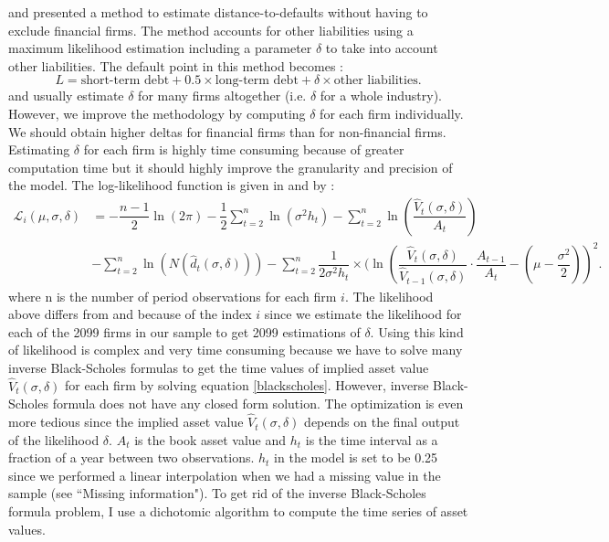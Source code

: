 \citet{Duan2012} and \citet{Duan2012DTD} presented a method to estimate distance-to-defaults without having to exclude financial firms. The method accounts for other liabilities using a maximum likelihood estimation including a parameter $\delta$ to take into account other liabilities. 
The default point in this method becomes :
\begin{equation}
L = \text{short-term debt} + 0.5 \times \text{long-term debt} + \delta \times \text{other liabilities}.
\end{equation}
\citet{Duan2012} and \citet{Duan2012DTD} usually estimate $\delta$ for many firms altogether (i.e. $\delta$ for a whole industry). However, we improve the methodology by computing $\delta$ for each firm individually. We should obtain higher deltas for financial firms than for non-financial firms. Estimating $\delta$ for each firm is highly time consuming because of greater computation time but it should highly improve the granularity and precision of the model.
The log-likelihood function is given in \citet{Duan2012} and \citet{Duan2012DTD} by :
\begin{align*}
\mathcal{L}_i(\mu,\sigma,\delta) &= -\dfrac{n-1}{2}\ln(2\pi) - \dfrac{1}{2}\sum_{t=2}^n \ln(\sigma^2h_t) - \sum_{t=2}^n \ln(\dfrac{\hat{V}_t(\sigma,\delta)}{A_t}) \\
&-\sum_{t=2}^n \ln(N(\hat{d}_t(\sigma,\delta))) -\sum_{t=2}^n \dfrac{1}{2\sigma^2h_t} \times (\ln(\dfrac{\hat{V}_t(\sigma,\delta)}{\hat{V}_{t-1}(\sigma,\delta)}\cdot \dfrac{A_{t-1}}{A_t}-(\mu - \dfrac{\sigma^2}{2}))^2.
\end{align*}
where n is the number of period observations for each firm $i$. The likelihood above differs from \citet{Duan2012} and \citet{Duan2012DTD} because of the index $i$ since we estimate the likelihood for each of the 2099 firms in our sample to get 2099 estimations of $\delta$. Using this kind of likelihood is complex and very time consuming because we have to solve many inverse Black-Scholes formulas to get the time values of implied asset value $\hat{V}_t(\sigma,\delta)$ for each firm by solving equation \ref{blackscholes}. However, inverse Black-Scholes formula does not have any closed form solution. The optimization is even more tedious since the implied asset value $\hat{V}_t(\sigma,\delta)$ depends on the final output of the likelihood $\delta$. $A_t$ is the book asset value and $h_t$ is the time interval as a fraction of a year between two observations. $h_t$ in the model is set to be 0.25 since we performed a linear interpolation when we had a missing value in the sample (see ``Missing information"). To get rid of the inverse Black-Scholes formula problem, I use a dichotomic algorithm to compute the time series of asset values.\\



